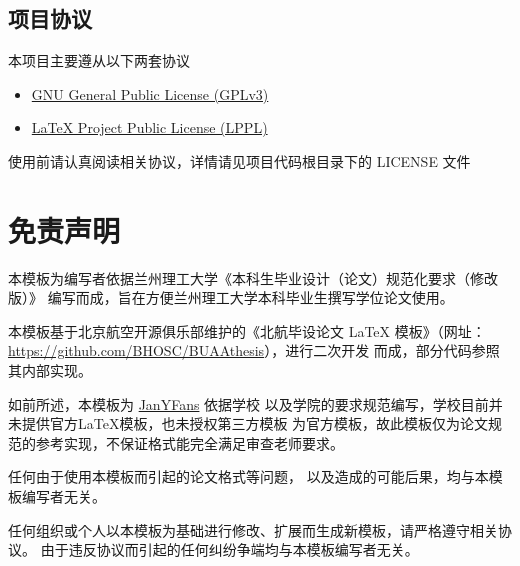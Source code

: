 \subsection{项目协议}
	本项目主要遵从以下两套协议
	\begin{itemize}
		\item \href{http://www.gnu.org/licenses/gpl.txt}
		{GNU General Public License (GPLv3)}
		\item \href{http://www.latex-project.org/lppl.txt}
		{\LaTeX{} Project Public License (LPPL)}
	\end{itemize}
	
	使用前请认真阅读相关协议，详情请见项目代码根目录下的 LICENSE 文件
	
\section{免责声明}

	本模板为编写者依据兰州理工大学《本科生毕业设计（论文）规范化要求（修改版）》
	编写而成，旨在方便兰州理工大学本科毕业生撰写学位论文使用。
	
	本模板基于北京航空开源俱乐部维护的《北航毕设论文 LaTeX
	模板》（网址：\url{https://github.com/BHOSC/BUAAthesis}），进行二次开发
	而成，部分代码参照其内部实现。
	
	如前所述，本模板为 \href{https://github.com/janyfans}{JanYFans} 依据学校
	以及学院的要求规范编写，学校目前并未提供官方\LaTeX{}模板，也未授权第三方模板
	为官方模板，故此模板仅为论文规范的参考实现，不保证格式能完全满足审查老师要求。
	
	任何由于使用本模板而引起的论文格式等问题，
	以及造成的可能后果，均与本模板编写者无关。
	
	任何组织或个人以本模板为基础进行修改、扩展而生成新模板，请严格遵守相关协议。
	由于违反协议而引起的任何纠纷争端均与本模板编写者无关。
